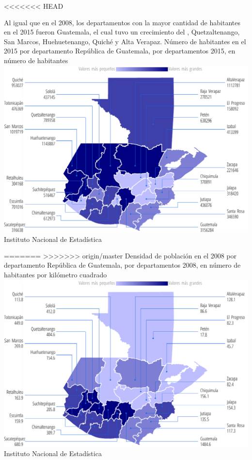   
   
<<<<<<< HEAD
   
    {%
Al igual que en el 2008, los departamentos con la mayor cantidad de habitantes en el 2015 fueron Guatemala, el cual tuvo un crecimiento del , Quetzaltenango, San Marcos, Huehuetenango, Quiché y Alta Verapaz.  }%
    {%
    	Número de habitantes en el 2015 por departamento
    } %
    {%
    	República de Guatemala, por departamentos 2015, en número de habitantes} %
    {%
    	\includegraphics[width=52\cuadri]{graficas/1_02.pdf}}%
    {%
    	Instituto Nacional de Estadística} %
    
    
    
=======
>>>>>>> origin/master
   {%
   }%
   {%
   	Densidad de población en el 2008 por departamento
   } %
   {%
   		República de Guatemala, por departamentos 2008, en número de habitantes por kilómetro cuadrado} %
   {%
   	\includegraphics[width=52\cuadri]{graficas/1_05.pdf}}%
   {%
   	Instituto Nacional de Estadística} %
   
